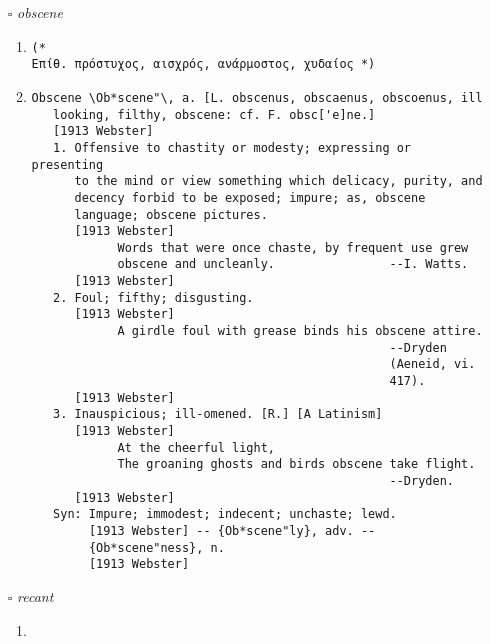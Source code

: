 \documentclass{article}
\begin{document}
\begin{itemize}
\begin{enumerate}
{\begin{lstlisting}
carcinoma \car`ci*no"ma\ (k[aum]r`s[i^]*n[=o]"m[.a]), n. [L.,
   fr. Gr. karki`nwma, fr. karki`nos crab, cancer. See {-oma}.]
   (Med.)
   A form of malignant cancer arising from epithelial tissue.
   The term was earlier applied to all forms of cancer, or to
   certain non-malignant forms. It is contrasted with {sarcoma},
   a malignant form of cancer arising from connective tissue.
   See {Cancer}. --Dunglison. --Stedman.
   [1913 Webster +PJC]
\end{lstlisting}}
\end{enumerate}
\item[$\square$] \emph{ obscene }
\begin{enumerate}
\item{
\begin{lstlisting}
(* 
Επίθ. πρόστυχος, αισχρός, ανάρμοστος, χυδαίος *)
\end{lstlisting}}
\item{
\begin{lstlisting}
Obscene \Ob*scene"\, a. [L. obscenus, obscaenus, obscoenus, ill
   looking, filthy, obscene: cf. F. obsc['e]ne.]
   [1913 Webster]
   1. Offensive to chastity or modesty; expressing or presenting
      to the mind or view something which delicacy, purity, and
      decency forbid to be exposed; impure; as, obscene
      language; obscene pictures.
      [1913 Webster]
            Words that were once chaste, by frequent use grew
            obscene and uncleanly.                --I. Watts.
      [1913 Webster]
   2. Foul; fifthy; disgusting.
      [1913 Webster]
            A girdle foul with grease binds his obscene attire.
                                                  --Dryden
                                                  (Aeneid, vi.
                                                  417).
      [1913 Webster]
   3. Inauspicious; ill-omened. [R.] [A Latinism]
      [1913 Webster]
            At the cheerful light,
            The groaning ghosts and birds obscene take flight.
                                                  --Dryden.
      [1913 Webster]
   Syn: Impure; immodest; indecent; unchaste; lewd.
        [1913 Webster] -- {Ob*scene"ly}, adv. --
        {Ob*scene"ness}, n.
        [1913 Webster]
\end{lstlisting}}
\end{enumerate}
\item[$\square$] \emph{ recant }
\begin{enumerate}
\item{
\begin{lstlisting}

\end{lstlisting}}
\end{enumerate}
\end{itemize}
\end{document}
